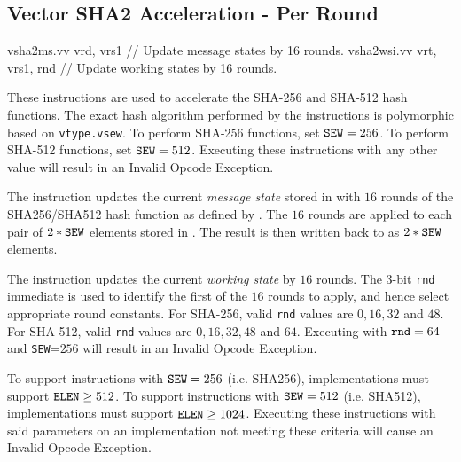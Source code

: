 
\subsection{Vector SHA2 Acceleration - Per Round}
\label{sec:vector:sha2:per-round}

\begin{cryptoisa}
vsha2ms.vv  vrd, vrs1      // Update message states by 16 rounds.
vsha2wsi.vv vrt, vrs1, rnd // Update working states by 16 rounds.
\end{cryptoisa}

These instructions are used to accelerate the SHA-256 and SHA-512
hash functions.
The exact hash algorithm performed by the instructions is
polymorphic based on {\tt vtype.vsew}.
To perform SHA-256 functions, set ${\tt SEW}=256$.
To perform SHA-512 functions, set ${\tt SEW}=512$.
Executing these instructions with any other \SEW value will
result in an Invalid Opcode Exception.

The  instruction updates the current {\em message state}
stored in  with $16$ rounds of the SHA256/SHA512 hash function
as defined by \SEW.
The $16$ rounds are applied to each pair of $2*{\tt SEW}$
elements stored in .
The result is then written back to \vrd as $2*{\tt SEW}$ elements.

The  instruction updates the current {\em working state}
by $16$ rounds.
The $3$-bit {\tt rnd} immediate is used to identify the first of
the $16$ rounds to apply, and hence select appropriate round constants.
For SHA-256, valid {\tt rnd} values are $0, 16, 32$   and $48$.
For SHA-512, valid {\tt rnd} values are $0, 16, 32, 48$ and $64$.
Executing  with
${\tt rnd}=64$ 
and
{\tt SEW}=$256$
will result in an Invalid Opcode Exception.


To support  instructions with ${\tt SEW}=256$ (i.e. SHA256),
implementations must support ${\tt ELEN} \ge 512$.
To support  instructions with ${\tt SEW}=512$ (i.e. SHA512),
implementations must support ${\tt ELEN} \ge 1024$.
Executing these instructions with said parameters on an implementation
not meeting these criteria will cause an Invalid Opcode Exception.

